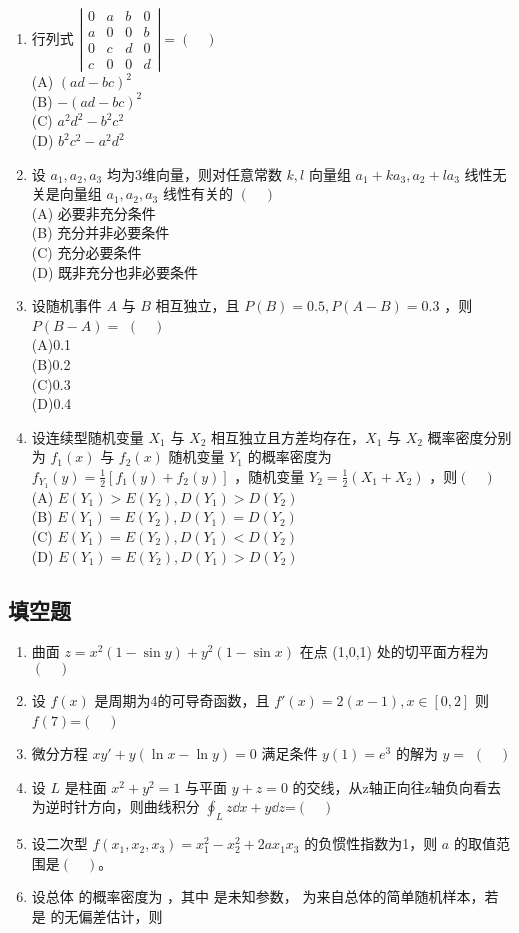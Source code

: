 \begin{enumerate}
\item 行列式 $ \left|\begin{array}{llll}0 & a & b & 0 \\ a & 0 & 0 & b \\ 0 & c & d & 0 \\ c & 0 & 0 & d\end{array}\right|=(\quad)$\\
(A) $(ad-bc)^2$\\
(B) $-(ad-bc)^2$\\
(C) $a^2d^2-b^2c^2$\\
(D) $b^2c^2-a^2d^2$
\item 设 $a_1,a_2,a_3$ 均为3维向量，则对任意常数 $k,l$ 向量组 $a_1+ka_3,a_2+la_3$ 线性无关是向量组 $a_1,a_2,a_3$ 线性有关的 $(\quad)$\\
(A) 必要非充分条件\\
(B) 充分并非必要条件\\
(C) 充分必要条件\\
(D) 既非充分也非必要条件
\item 设随机事件 $A$ 与 $B$ 相互独立，且 $P(B)=0.5,P(A-B)=0.3$ ，则$P(B-A)=$ $(\quad)$\\
(A)0.1\\
(B)0.2\\
(C)0.3\\
(D)0.4
\item 设连续型随机变量 $X_1$ 与 $X_2$ 相互独立且方差均存在，$X_1$  与 $X_2$ 概率密度分别为 $f_1(x)$ 与 $f_2(x)$ 随机变量 $Y_1$ 的概率密度为 $f_{Y_1}(y)=\frac{1}{2}[f_1(y)+f_2(y)]$ ，随机变量 $Y_2=\frac{1}{2}(X_1+X_2)$ ，则$(\quad)$\\
(A) $E(Y_1)>E(Y_2),D(Y_1)>D(Y_2)$\\
(B) $E(Y_1)=E(Y_2),D(Y_1)=D(Y_2)$\\
(C) $E(Y_1)=E(Y_2),D(Y_1)<D(Y_2)$\\
(D) $E(Y_1)=E(Y_2),D(Y_1)>D(Y_2)$

\end{enumerate}
\subsection{填空题}
\begin{enumerate}
\item 曲面 $z=x^2(1-\sin y)+y^2(1-\sin x)$  在点 (1,0,1) 处的切平面方程为$(\quad)$
\item 设 $f(x)$ 是周期为4的可导奇函数，且 $f'(x)=2(x-1),x \in [0,2]$  则 $f(7)$=$(\quad)$
\item 微分方程 $xy'+y(\ln x-\ln y)=0$ 满足条件 $y(1)=e^3$ 的解为 $y=$ $(\quad)$
\item 设 $L$ 是柱面 $x^2+y^2=1$ 与平面 $y+z=0$ 的交线，从z轴正向往z轴负向看去为逆时针方向，则曲线积分 $\displaystyle \oint_L z\dd{x}+y\dd{z}$=$(\quad)$
\item 设二次型 $f(x_1,x_2,x_3)=x_1^2-x_2^2+2ax_1x_3$  的负惯性指数为1，则 $a$ 的取值范围是$(\quad)$。
\item 设总体 的概率密度为  ，其中  是未知参数，   为来自总体的简单随机样本，若   是  的无偏差估计，则  
\end{enumerate}
